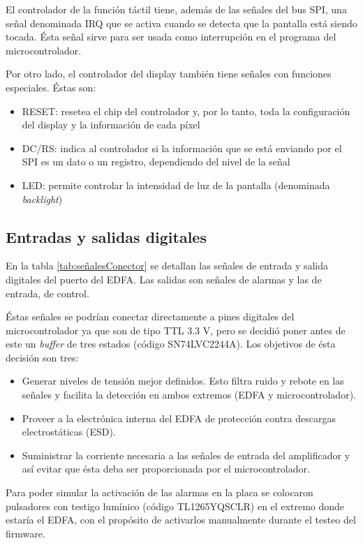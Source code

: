 El controlador de la función táctil tiene, además de las señales del bus SPI, una señal denominada IRQ que se activa cuando se detecta que la pantalla está siendo tocada. Ésta señal sirve para ser usada como interrupción en el programa del microcontrolador.

Por otro lado, el controlador del display también tiene señales con funciones especiales. Éstas son:

\begin{itemize}
\item RESET: resetea el chip del controlador y, por lo tanto, toda la configuración del display y la información de cada píxel
\item DC/RS: indica al controlador si la información que se está enviando por el SPI es un dato o un registro, dependiendo del nivel de la señal
\item LED: permite controlar la intensidad de luz de la pantalla (denominada \textit{backlight})
\end{itemize}

\subsection{Entradas y salidas digitales}

En la tabla \ref{tab:señalesConector} se detallan las señales de entrada y salida digitales del puerto del EDFA. Las salidas son señales de alarmas y las de entrada, de control.

Éstas señales se podrían conectar directamente a pines digitales del microcontrolador ya que son de tipo TTL 3.3 V, pero se decidió poner antes de este un \textit{buffer} de tres estados (código SN74LVC2244A). Los objetivos de ésta decisión son tres:

\begin{itemize}
\item Generar niveles de tensión mejor definidos. Esto filtra ruido y rebote en las señales y facilita la detección en ambos extremos (EDFA y microcontrolador).
\item Proveer a la electrónica interna del EDFA de protección contra descargas electrostáticas (ESD).
\item Suministrar la corriente necesaria a las señales de entrada del amplificador y así evitar que ésta deba ser proporcionada por el microcontrolador.
\end{itemize}

Para poder simular la activación de las alarmas en la placa se colocaron pulsadores con testigo lumínico (código TL1265YQSCLR) en el extremo donde estaría el EDFA, con el propósito de activarlos manualmente durante el testeo del firmware.

